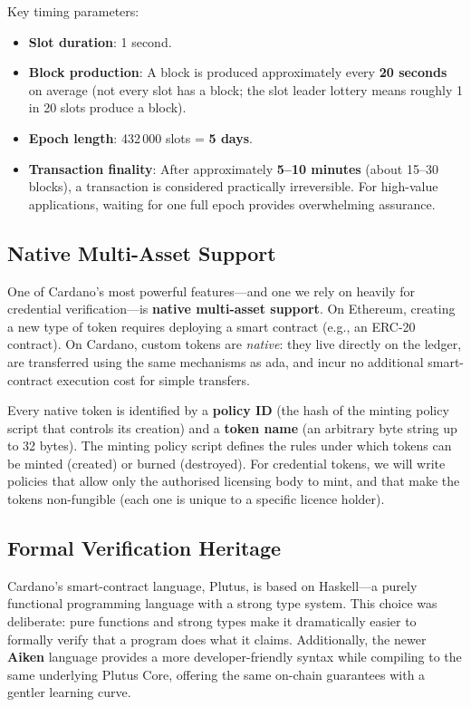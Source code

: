 Key timing parameters:

\begin{itemize}
  \item \textbf{Slot duration}: 1 second.
  \item \textbf{Block production}: A block is produced approximately every
        \textbf{20 seconds} on average (not every slot has a block; the slot
        leader lottery means roughly 1 in 20 slots produce a block).
  \item \textbf{Epoch length}: 432\,000 slots = \textbf{5 days}.
  \item \textbf{Transaction finality}: After approximately \textbf{5--10
        minutes} (about 15--30 blocks), a transaction is considered
        practically irreversible.  For high-value applications, waiting for
        one full epoch provides overwhelming assurance.
\end{itemize}

\subsection{Native Multi-Asset Support}

One of Cardano's most powerful features---and one we rely on heavily for
credential verification---is \textbf{native multi-asset support}.  On
Ethereum, creating a new type of token requires deploying a smart contract
(e.g., an ERC-20 contract).  On Cardano, custom tokens are \emph{native}:
they live directly on the ledger, are transferred using the same mechanisms
as ada, and incur no additional smart-contract execution cost for simple
transfers.

Every native token is identified by a \textbf{policy ID} (the hash of the
minting policy script that controls its creation) and a \textbf{token name}
(an arbitrary byte string up to 32 bytes).  The minting policy script defines
the rules under which tokens can be minted (created) or burned (destroyed).
For credential tokens, we will write policies that allow only the authorised
licensing body to mint, and that make the tokens non-fungible (each one is
unique to a specific licence holder).

\subsection{Formal Verification Heritage}

Cardano's smart-contract language, Plutus, is based on Haskell---a purely
functional programming language with a strong type system.  This choice was
deliberate: pure functions and strong types make it dramatically easier to
formally verify that a program does what it claims.  Additionally, the newer
\textbf{Aiken} language provides a more developer-friendly syntax while
compiling to the same underlying Plutus Core, offering the same on-chain
guarantees with a gentler learning curve.

